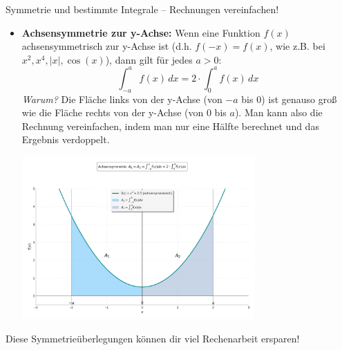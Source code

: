 \begin{infoboxumgebung}{Symmetrie und bestimmte Integrale – Rechnungen vereinfachen!}
\begin{itemize}
    \item \textbf{Achsensymmetrie zur y-Achse:}
        Wenn eine Funktion $f(x)$ achsensymmetrisch zur y-Achse ist (d.h. $f(-x) = f(x)$, wie z.B. bei $x^2, x^4, |x|, \cos(x)$), dann gilt für jedes $a>0$:
        \[ \int_{-a}^{a} f(x) \,dx = 2 \cdot \int_{0}^{a} f(x) \,dx \]
        \textit{Warum?} Die Fläche links von der y-Achse (von $-a$ bis $0$) ist genauso groß wie die Fläche rechts von der y-Achse (von $0$ bis $a$). Man kann also die Rechnung vereinfachen, indem man nur eine Hälfte berechnet und das Ergebnis verdoppelt.
        \begin{center}
            \includegraphics[width=0.7\textwidth]{grafiken/Integral_Achsensymmetrie.png}
            \label{fig:integral_achsensymmetrie}
        \end{center}
\end{itemize}
Diese Symmetrieüberlegungen können dir viel Rechenarbeit ersparen!
\end{infoboxumgebung}

